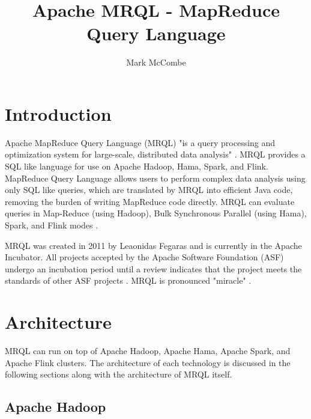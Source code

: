 \documentclass[9pt,twocolumn,twoside]{../../styles/osajnl}
\title{Apache MRQL - MapReduce Query Language}
\author[1,*]{Mark McCombe}
\affil[1]{School of Informatics and Computing, Bloomington, IN 47408, U.S.A.}
\affil[*]{Corresponding authors: mmccombe@iu.edu}
\begin{document}
\maketitle




\section{Introduction}

Apache MapReduce Query Language (MRQL) "is a query processing and optimization system for large-scale, distributed data analysis" \cite{www-apacheincubator}. MRQL provides a SQL like language for use on Apache Hadoop, Hama, Spark, and Flink. MapReduce Query Language allows users to perform complex data analysis using only SQL like queries, which are translated by MRQL into efficient Java code, removing the burden of writing MapReduce code directly. MRQL can evaluate queries in Map-Reduce (using Hadoop), Bulk Synchronous Parallel (using Hama), Spark, and Flink modes \cite{www-apacheincubator}.

MRQL was created in 2011 by Leaonidas Fegaras \cite{www-mrqlhadoop} and is currently in the Apache Incubator. All projects accepted by the Apache Software Foundation (ASF) undergo an incubation period until a review indicates that the project meets the standards of other ASF projects \cite{www-apachemrql}.  MRQL is pronounced "miracle" \cite{www-apacheincubator}.

\section{Architecture}

MRQL can run on top of Apache Hadoop, Apache Hama, Apache Spark, and Apache Flink clusters.  The architecture of each technology is discussed in the following sections along with the architecture of MRQL itself. 





\subsection{Apache Hadoop}
\end{document}
